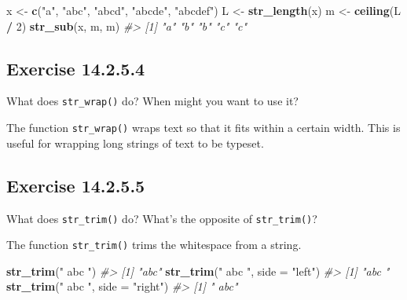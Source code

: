 \documentclass[]{book}
\newenvironment{Shaded}{\begin{snugshade}}{\end{snugshade}}
\newcommand{\CommentTok}[1]{\textcolor[rgb]{0.56,0.35,0.01}{\textit{#1}}}
\newcommand{\DataTypeTok}[1]{\textcolor[rgb]{0.13,0.29,0.53}{#1}}
\newcommand{\DecValTok}[1]{\textcolor[rgb]{0.00,0.00,0.81}{#1}}
\newcommand{\KeywordTok}[1]{\textcolor[rgb]{0.13,0.29,0.53}{\textbf{#1}}}
\newcommand{\NormalTok}[1]{#1}
\newcommand{\OperatorTok}[1]{\textcolor[rgb]{0.81,0.36,0.00}{\textbf{#1}}}
\newcommand{\StringTok}[1]{\textcolor[rgb]{0.31,0.60,0.02}{#1}}
\theoremstyle{plain}
\theoremstyle{remark}
\begin{document}
\begin{Shaded}
\begin{Highlighting}[]
\NormalTok{x <-}\StringTok{ }\KeywordTok{c}\NormalTok{(}\StringTok{"a"}\NormalTok{, }\StringTok{"abc"}\NormalTok{, }\StringTok{"abcd"}\NormalTok{, }\StringTok{"abcde"}\NormalTok{, }\StringTok{"abcdef"}\NormalTok{)}
\NormalTok{L <-}\StringTok{ }\KeywordTok{str_length}\NormalTok{(x)}
\NormalTok{m <-}\StringTok{ }\KeywordTok{ceiling}\NormalTok{(L }\OperatorTok{/}\StringTok{ }\DecValTok{2}\NormalTok{)}
\KeywordTok{str_sub}\NormalTok{(x, m, m)}
\CommentTok{#> [1] "a" "b" "b" "c" "c"}
\end{Highlighting}
\end{Shaded}

\hypertarget{exercise-14.2.5.4}{%
\subsection*{\texorpdfstring{Exercise
{14.2.5.4}}{Exercise 14.2.5.4}}\label{exercise-14.2.5.4}}

What does \texttt{str\_wrap()} do? When might you want to use it?

The function \texttt{str\_wrap()} wraps text so that it fits within a
certain width. This is useful for wrapping long strings of text to be
typeset.

\hypertarget{exercise-14.2.5.5}{%
\subsection*{\texorpdfstring{Exercise
{14.2.5.5}}{Exercise 14.2.5.5}}\label{exercise-14.2.5.5}}

What does \texttt{str\_trim()} do? What's the opposite of
\texttt{str\_trim()}?

The function \texttt{str\_trim()} trims the whitespace from a string.

\begin{Shaded}
\begin{Highlighting}[]
\KeywordTok{str_trim}\NormalTok{(}\StringTok{" abc "}\NormalTok{)}
\CommentTok{#> [1] "abc"}
\KeywordTok{str_trim}\NormalTok{(}\StringTok{" abc "}\NormalTok{, }\DataTypeTok{side =} \StringTok{"left"}\NormalTok{)}
\CommentTok{#> [1] "abc "}
\KeywordTok{str_trim}\NormalTok{(}\StringTok{" abc "}\NormalTok{, }\DataTypeTok{side =} \StringTok{"right"}\NormalTok{)}
\CommentTok{#> [1] " abc"}
\end{Highlighting}
\end{Shaded}
\end{document}
